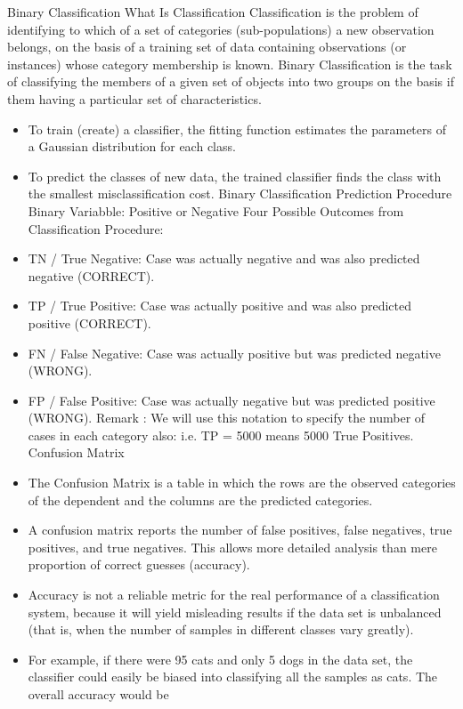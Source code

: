 \documentclass[a4paper,12pt]{article}
\begin{document}
Binary Classification
What Is Classification
Classification is the problem of identifying to which of a set of categories (sub-populations) a new
observation belongs, on the basis of a training set of data containing observations (or instances)
whose category membership is known. Binary Classification is the task of classifying the members of
a given set of objects into two groups on the basis if them having a particular set of characteristics.
\begin{itemize}

\item  To train (create) a classifier, the fitting function estimates the parameters of a Gaussian
distribution for each class.
\item  To predict the classes of new data, the trained classifier finds the class with the smallest
misclassification cost.
Binary Classification Prediction Procedure
Binary Variabble: Positive or Negative
Four Possible Outcomes from Classification Procedure:
\item  TN / True Negative: Case was actually negative and was also predicted negative
(CORRECT).
\item  TP / True Positive: Case was actually positive and was also predicted positive (CORRECT).
\item  FN / False Negative: Case was actually positive but was predicted negative
(WRONG).
\item  FP / False Positive: Case was actually negative but was predicted positive (WRONG).
Remark : We will use this notation to specify the number of cases in each category also: i.e. TP
= 5000 means 5000 True Positives.
Confusion Matrix
\item  The Confusion Matrix is a table in which the rows are the observed categories of the dependent
and the columns are the predicted categories.
\item  A confusion matrix reports the number of false positives, false negatives, true positives, and
true negatives. This allows more detailed analysis than mere proportion of correct guesses
(accuracy).
\item  Accuracy is not a reliable metric for the real performance of a classification system, because
it will yield misleading results if the data set is unbalanced (that is, when the number of
samples in different classes vary greatly).
\item  For example, if there were 95 cats and only 5 dogs in the data set, the classifier could
easily be biased into classifying all the samples as cats. The overall accuracy would be

\end{itemize}
\end{document}
